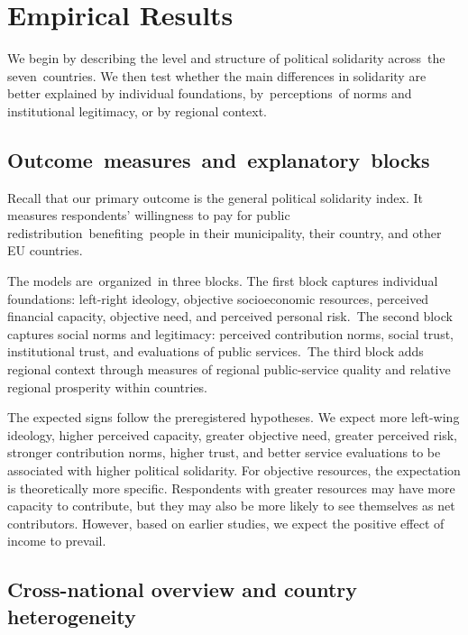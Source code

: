 \documentclass[12pt]{article}
\begin{document}
\section{\texorpdfstring{Empirical Results
}{Empirical Results }}\label{empirical-results}

We begin by describing the level and structure of political solidarity
across~the seven~countries. We then test whether the main differences in
solidarity are better explained by individual foundations,
by~perceptions~of norms and institutional legitimacy, or by regional
context.~

\subsection{Outcome~measures~and~explanatory~blocks~}\label{outcome-measures-and-explanatory-blocks}

Recall that our primary outcome is the general political solidarity
index. It measures respondents' willingness to pay for public
redistribution~benefiting~people in their municipality, their country,
and other EU countries.

The models are~organized~in three blocks. The first block captures
individual foundations: left-right ideology, objective socioeconomic
resources, perceived financial capacity, objective need, and perceived
personal risk.~The second block captures social norms and legitimacy:
perceived contribution norms, social trust, institutional trust, and
evaluations of public services.~The third block adds regional context
through measures of regional public-service quality and relative
regional prosperity within countries.~

The expected signs follow the preregistered hypotheses. We expect more
left-wing ideology, higher perceived capacity, greater objective need,
greater perceived risk, stronger contribution norms, higher trust, and
better service evaluations to be associated with higher political
solidarity. For objective resources, the expectation is theoretically
more specific. Respondents with greater resources may have more capacity
to contribute, but they may also be more likely to see themselves as net
contributors. However, based on earlier studies, we expect the positive
effect of income to prevail.~

\subsection{Cross-national overview and country
heterogeneity~}\label{cross-national-overview-and-country-heterogeneity}
\end{document}
